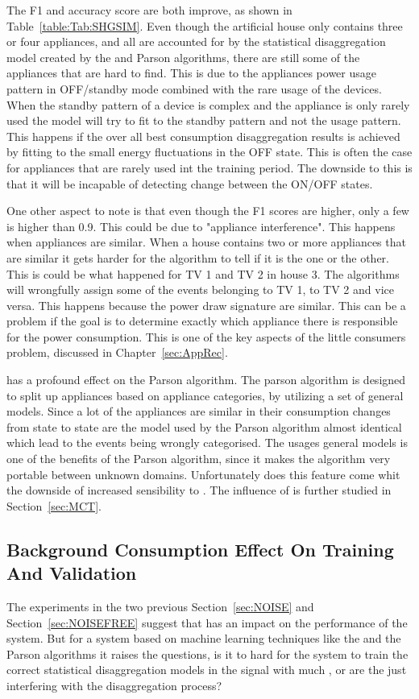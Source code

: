 The F1 and accuracy score are both improve, as shown in Table~\ref{table:Tab:SHGSIM}. Even though the artificial house only contains three or four appliances, and all are accounted for by the statistical disaggregation model created by the  and Parson algorithms, there are still some of the appliances that are hard to find. This is due to the appliances power usage pattern in OFF/standby mode combined with the rare usage of the devices. When the standby pattern of a device is complex and the appliance is only rarely used the model will try to fit to the standby pattern and not the usage pattern. This happens if the over all best consumption disaggregation results is achieved by fitting to the small energy fluctuations in the OFF state. This is often the case for appliances that are rarely used int the training period. The downside to this is that it will be incapable of detecting change between the ON/OFF states.

One other aspect to note is that even though the F1 scores are higher, only a few is higher than 0.9. 
This could be due to "appliance interference". This happens when appliances are similar. When a house contains two or more appliances that are similar it gets harder for the algorithm to tell if it is the one or the other. This is could be what happened for TV 1 and TV 2 in house 3. The algorithms will wrongfully assign some of the events belonging to TV 1, to TV 2 and vice versa. This happens because the power draw signature are similar.  This can be a problem if the goal is to determine exactly which appliance there is responsible for the power consumption. This is one of the key aspects of the little consumers problem, discussed in Chapter~\ref{sec:AppRec}.

 has a profound effect on the Parson algorithm. The parson algorithm is designed to split up appliances based on appliance categories, by utilizing a set of general models. Since a lot of the appliances are similar in their consumption changes from state to state are the model used by the Parson algorithm almost identical which lead to the events being wrongly categorised. The usages general models is one of the benefits of the Parson algorithm, since it makes the algorithm very portable between unknown domains. Unfortunately does this feature come whit the downside of increased sensibility to . The influence of  is further studied in Section~\ref{sec:MCT}. 

\subsection{Background Consumption Effect On Training And Validation }
The experiments in the two previous Section~\ref{sec:NOISE} and Section~\ref{sec:NOISEFREE} suggest that  has an impact on the performance of the system. But for a system based on machine learning techniques like the  and the Parson algorithms it raises the questions, is it to hard for the system to train the correct statistical disaggregation models in the signal with much , or are the  just interfering with the disaggregation process? 

